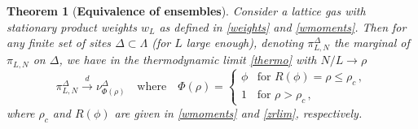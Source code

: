 \documentclass[pdflatex,sn-mathphys-num]{sn-jnl}%
\theoremstyle{thmstyleone}%
\newtheorem{theorem}{Theorem}%
\theoremstyle{thmstyletwo}%
\theoremstyle{thmstylethree}%
\begin{document}
\begin{theorem}[\textbf{Equivalence of ensembles}]\label{equivalence}
Consider a lattice gas with stationary product weights $w_L$ as defined in \eqref{weights} and \eqref{wmoments}. Then for any finite set of sites $\Delta\subset\Lambda$ (for $L$ large enough), denoting $\pi_{L,N}^\Delta$ the marginal of $\pi_{L,N}$ on $\Delta$, we have in the thermodynamic limit \eqref{thermo} with $N/L\to\rho$
\[
\pi_{L,N}^\Delta \overset{d}{\longrightarrow} \nu_{\Phi (\rho )}^\Delta \quad\mbox{where}\quad \Phi (\rho )=\begin{cases}
	\phi &\text{for } R(\phi) = \rho \leq \rho_c\,, \\
	1 &\text{for } \rho > \rho_c\,,
\end{cases}
\]
where $\rho_c$ and $R(\phi)$ are given in \eqref{wmoments} and \eqref{zrlim}, respectively.
\end{theorem}
\end{document}
